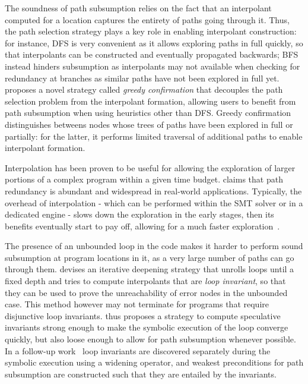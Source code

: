 The soundness of path subsumption relies on the fact that an interpolant computed for a location captures the entirety of paths going through it. Thus, the path selection strategy plays a key role in enabling interpolant construction: for instance, DFS is very convenient as it allows exploring paths in full quickly, so that interpolants can be constructed and eventually propagated backwards; BFS instead hinders subsumption as interpolants may not available when checking for redundancy at branches as similar paths have not been explored in full yet. \cite{JMN13} proposes a novel strategy called {\em greedy confirmation} that decouples the path selection problem from the interpolant formation, allowing users to benefit from path subsumption when using heuristics other than DFS. Greedy confirmation distinguishes betweens nodes whose trees of paths have been explored in full or partially: for the latter, it performs limited traversal of additional paths to enable interpolant formation.

Interpolation has been proven to be useful for allowing the exploration of larger portions of a complex program within a given time budget. \cite{YYG15} claims that path redundancy is abundant and widespread in real-world applications. Typically, the overhead of interpolation - which can be performed within the SMT solver or in a dedicated engine - slows down the exploration in the early stages, then its benefits eventually start to pay off, allowing for a much faster exploration~\cite{JMN13}. 


 The presence of an unbounded loop in the code makes it harder to perform sound subsumption at program locations in it, as a very large number of paths can go through them. \cite{McMillan10} devises an iterative deepening strategy that unrolls loops until a fixed depth and tries to compute interpolants that are {\em loop invariant}, so that they can be used to prove the unreachability of error nodes in the unbounded case. This method however may not terminate for programs that require disjunctive loop invariants. \cite{JNS11} thus proposes a strategy to compute speculative invariants strong enough to make the symbolic execution of the loop converge quickly, but also loose enough to allow for path subsumption whenever possible. In a follow-up work~\cite{JMN12} loop invariants are discovered separately during the symbolic execution using a widening operator, and weakest preconditions for path subsumption are constructed such that they are entailed by the invariants.

